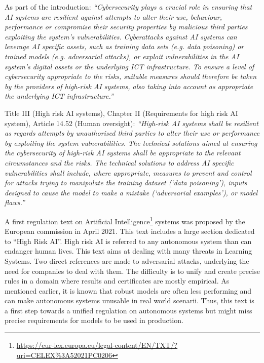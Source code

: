 \begin{tcolorbox}[title=References to adversarial examples in European Commission in law proposal on Artificial Intelligence systems]
\label{ref:adversarial_law}
As part of the introduction: \textit{``Cybersecurity plays a crucial role in ensuring that AI systems are resilient against attempts to alter their use, behaviour, performance or compromise their security properties by malicious third parties exploiting the system’s vulnerabilities. Cyberattacks against AI systems can leverage AI specific assets, such as training data sets (e.g. data poisoning) or trained models (e.g. adversarial attacks), or exploit vulnerabilities in the AI system’s digital assets or the underlying ICT infrastructure. To ensure a level of cybersecurity appropriate to the risks, suitable measures should therefore be taken by the providers of high-risk AI systems, also taking into account as appropriate the underlying ICT infrastructure.''}

\medskip
Title III (High risk AI systems), Chapter II (Requirements for high risk AI system), Article 14.52 (Human oversight): \textit{``High-risk AI systems shall be resilient as regards attempts by unauthorised third parties to alter their use or performance by exploiting the system vulnerabilities.
The technical solutions aimed at ensuring the cybersecurity of high-risk AI systems shall be appropriate to the relevant circumstances and the risks.
The technical solutions to address AI specific vulnerabilities shall include, where appropriate, measures to prevent and control for attacks trying to manipulate the training dataset (‘data poisoning’), inputs designed to cause the model to make a mistake (‘adversarial examples’), or model flaws.''}
\end{tcolorbox}
\medskip
A first regulation text on Artificial Intelligence\footnote{\url{https://eur-lex.europa.eu/legal-content/EN/TXT/?uri=CELEX\%3A52021PC0206}} systems was proposed by the European commission in April 2021. This text includes a large section dedicated to ``High Risk AI''. High risk AI is referred to any autonomous system than can endanger human lives.  This text aims at dealing with many threats in Learning Systems. Two direct references are made to adversarial attacks, underlying the need for companies to deal with them. The difficulty is to unify and create precise rules in a domain where results and certificates are mostly empirical. As mentioned earlier, it is known that robust models are often less performing and can make autonomous systems unusable in real world scenarii. Thus, this text is a first step towards a unified regulation on autonomous systems but might miss precise requirements for models to be used in production.



